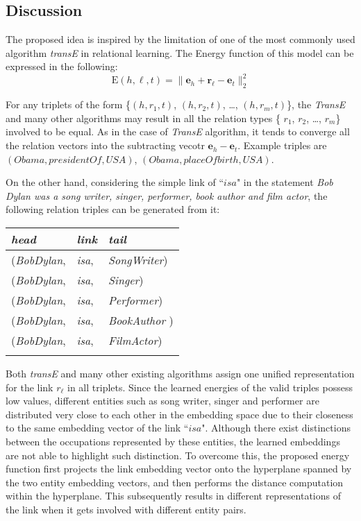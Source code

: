 \documentclass[10pt,journal]{IEEEtran}
\begin{document}
\subsection{Discussion}
The proposed idea is inspired by the limitation of one of the most commonly used algorithm \emph{transE} \cite{bordes_translating_2013}  in relational learning. The Energy function of this model can be expressed in the following:
\begin{equation}
\mathrm{E}{(h,\ell, t)} = \|\bm{e}_h + \bm{r}_{\ell}-\bm{e}_t\|_2^2
\end{equation}

For any triplets of the form \{$(h, r_1, t)$, $(h, r_2, t)$, \ldots, $(h, r_m, t)$\}, the \emph{TransE}  and many other algorithms may result in all the relation types  \{ $r_1$, $r_2$, \ldots, $r_m$\} involved to be equal. As in the case of \emph{TransE} algorithm, it tends to converge all the relation vectors into the subtracting vecotr  $\bm{e}_h - \bm{e}_t$.  Example triples are $(Obama, presidentOf, USA)$, $(Obama, placeOfbirth, USA)$.

 On the other hand, considering the simple link of ``$isa$" in  the statement \emph{Bob Dylan was a song writer, singer, performer, book author and film actor}, the following relation triples can be generated from it:
\\
\begin{tabular}[center]{l l l} 
 \\
 \emph{head} & \emph{link} & \emph{tail} \\
 \hline 
 (\emph{BobDylan}, & \emph{isa}, & \emph{SongWriter}) \\
 (\emph{BobDylan}, & \emph{isa}, & \emph{Singer}) \\
  (\emph{BobDylan}, & \emph{isa}, & \emph{Performer}) \\
   (\emph{BobDylan}, & \emph{isa}, & \emph{BookAuthor }) \\
    (\emph{BobDylan}, & \emph{isa}, & \emph{FilmActor}) \\\\
 \end{tabular}
 
Both \emph{transE} and many other existing algorithms assign one unified representation for the link $r_{\ell}$ in all triplets.  Since the learned energies of the valid triples  possess low values,  different entities such as song writer, singer and performer are  distributed very close to each other in the embedding space due to their closeness to the same embedding vector of  the link ``$isa$". Although there exist distinctions between the occupations represented by these entities, the learned embeddings are not able to highlight such distinction. To overcome this,  the proposed energy function  first projects the link embedding vector onto the hyperplane spanned by the two  entity embedding vectors, and then performs the distance computation within the hyperplane.  This subsequently results in different representations of the link when it gets involved with different entity pairs.  
\end{document}
